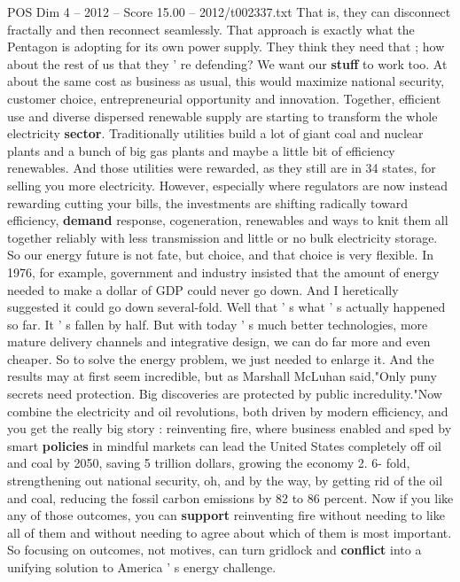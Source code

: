 \begin{textsample}{POS Dim 4 – 2012 – Score 15.00 – 2012/t002337.txt}
That is, they can disconnect fractally and then reconnect seamlessly.
That approach is exactly what the Pentagon is adopting for its own power supply.
They think they need that ; how about the rest of us that they ' re defending?
We want our \textbf{stuff} to work too.
At about the same cost as business as usual, this would maximize national security, customer choice, entrepreneurial opportunity and innovation.
Together, efficient use and diverse dispersed renewable supply are starting to transform the whole electricity \textbf{sector}.
Traditionally utilities build a lot of giant coal and nuclear plants and a bunch of big gas plants and maybe a little bit of efficiency renewables.
And those utilities were rewarded, as they still are in 34 states, for selling you more electricity.
However, especially where regulators are now instead rewarding cutting your bills, the investments are shifting radically toward efficiency, \textbf{demand} response, cogeneration, renewables and ways to knit them all together reliably with less transmission and little or no bulk electricity storage.
So our energy future is not fate, but choice, and that choice is very flexible.
In 1976, for example, government and industry insisted that the amount of energy needed to make a dollar of GDP could never go down.
And I heretically suggested it could go down several-fold.
Well that ' s what ' s actually happened so far.
It ' s fallen by half.
But with today ' s much better technologies, more mature delivery channels and integrative design, we can do far more and even cheaper.
So to solve the energy problem, we just needed to enlarge it.
And the results may at first seem incredible, but as Marshall McLuhan said,"Only puny secrets need protection.
Big discoveries are protected by public incredulity."Now combine the electricity and oil revolutions, both driven by modern efficiency, and you get the really big story : reinventing fire, where business enabled and sped by smart \textbf{policies} in mindful markets can lead the United States completely off oil and coal by 2050, saving 5 trillion dollars, growing the economy 2. 6- fold, strengthening out national security, oh, and by the way, by getting rid of the oil and coal, reducing the fossil carbon emissions by 82 to 86 percent.
Now if you like any of those outcomes, you can \textbf{support} reinventing fire without needing to like all of them and without needing to agree about which of them is most important.
So focusing on outcomes, not motives, can turn gridlock and \textbf{conflict} into a unifying solution to America ' s energy challenge.

\end{textsample}
